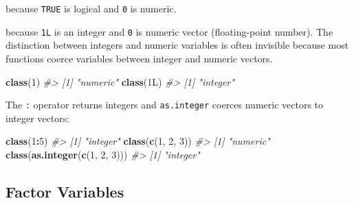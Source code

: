 \documentclass[]{book}
\newenvironment{Shaded}{\begin{snugshade}}{\end{snugshade}}
\newcommand{\CommentTok}[1]{\textcolor[rgb]{0.56,0.35,0.01}{\textit{#1}}}
\newcommand{\DataTypeTok}[1]{\textcolor[rgb]{0.13,0.29,0.53}{#1}}
\newcommand{\DecValTok}[1]{\textcolor[rgb]{0.00,0.00,0.81}{#1}}
\newcommand{\KeywordTok}[1]{\textcolor[rgb]{0.13,0.29,0.53}{\textbf{#1}}}
\newcommand{\NormalTok}[1]{#1}
\newcommand{\OperatorTok}[1]{\textcolor[rgb]{0.81,0.36,0.00}{\textbf{#1}}}
\newcommand{\StringTok}[1]{\textcolor[rgb]{0.31,0.60,0.02}{#1}}
\theoremstyle{definition}
\theoremstyle{definition}
\theoremstyle{definition}
\theoremstyle{remark}
\begin{document}
because \texttt{TRUE} is logical and \texttt{0} is numeric.

\begin{Shaded}
\end{Shaded}

because \texttt{1L} is an integer and \texttt{0} is numeric vector
(floating-point number). The distinction between integers and numeric
variables is often invisible because most functions coerce variables
between integer and numeric vectors.

\begin{Shaded}
\begin{Highlighting}[]
\KeywordTok{class}\NormalTok{(}\DecValTok{1}\NormalTok{)}
\CommentTok{#> [1] "numeric"}
\KeywordTok{class}\NormalTok{(1L)}
\CommentTok{#> [1] "integer"}
\end{Highlighting}
\end{Shaded}

The \texttt{:} operator returns integers and \texttt{as.integer} coerces
numeric vectors to integer vectors:

\begin{Shaded}
\begin{Highlighting}[]
\KeywordTok{class}\NormalTok{(}\DecValTok{1}\OperatorTok{:}\DecValTok{5}\NormalTok{)}
\CommentTok{#> [1] "integer"}
\KeywordTok{class}\NormalTok{(}\KeywordTok{c}\NormalTok{(}\DecValTok{1}\NormalTok{, }\DecValTok{2}\NormalTok{, }\DecValTok{3}\NormalTok{))}
\CommentTok{#> [1] "numeric"}
\KeywordTok{class}\NormalTok{(}\KeywordTok{as.integer}\NormalTok{(}\KeywordTok{c}\NormalTok{(}\DecValTok{1}\NormalTok{, }\DecValTok{2}\NormalTok{, }\DecValTok{3}\NormalTok{)))}
\CommentTok{#> [1] "integer"}
\end{Highlighting}
\end{Shaded}

\hypertarget{factor-variables}{%
\subsection{Factor Variables}\label{factor-variables}}
\end{document}
